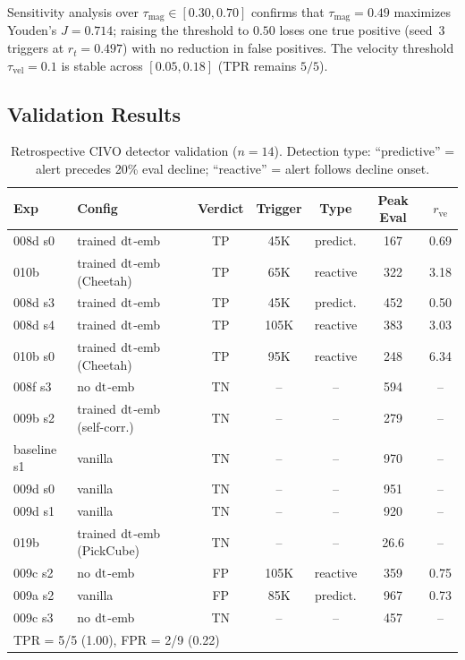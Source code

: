 Sensitivity analysis over $\tau_\text{mag} \in [0.30, 0.70]$ confirms that $\tau_\text{mag} = 0.49$ maximizes Youden's $J = 0.714$; raising the threshold to $0.50$ loses one true positive (seed~3 triggers at $r_t = 0.497$) with no reduction in false positives. The velocity threshold $\tau_\text{vel} = 0.1$ is stable across $[0.05, 0.18]$ (TPR remains $5/5$).

\subsection{Validation Results}

\begin{table}[ht]
\centering
\caption{Retrospective CIVO detector validation ($n{=}14$). Detection type: ``predictive'' = alert precedes 20\% eval decline; ``reactive'' = alert follows decline onset.}
\label{tab:detector-validation}
\footnotesize
\setlength{\tabcolsep}{3pt}
\begin{tabular}{llccccc}
\toprule
\textbf{Exp} & \textbf{Config} & \textbf{Verdict} & \textbf{Trigger} & \textbf{Type} & \textbf{Peak Eval} & $r_\text{ve}$ \\
\midrule
008d s0 & trained $\mathrm{dt}$-emb & TP & 45K & predict. & 167 & 0.69 \\
010b & trained $\mathrm{dt}$-emb (Cheetah) & TP & 65K & reactive & 322 & 3.18 \\
008d s3 & trained $\mathrm{dt}$-emb & TP & 45K & predict. & 452 & 0.50 \\
008d s4 & trained $\mathrm{dt}$-emb & TP & 105K & reactive & 383 & 3.03 \\
010b s0 & trained $\mathrm{dt}$-emb (Cheetah) & TP & 95K & reactive & 248 & 6.34 \\
\midrule
008f s3 & no $\mathrm{dt}$-emb & TN & -- & -- & 594 & -- \\
009b s2 & trained $\mathrm{dt}$-emb (self-corr.) & TN & -- & -- & 279 & -- \\
baseline s1 & vanilla & TN & -- & -- & 970 & -- \\
009d s0 & vanilla & TN & -- & -- & 951 & -- \\
009d s1 & vanilla & TN & -- & -- & 920 & -- \\
019b & trained $\mathrm{dt}$-emb (PickCube) & TN & -- & -- & 26.6 & -- \\
\midrule
009c s2 & no $\mathrm{dt}$-emb & FP & 105K & reactive & 359 & 0.75 \\
009a s2 & vanilla & FP & 85K & predict. & 967 & 0.73 \\
\midrule
009c s3 & no $\mathrm{dt}$-emb & TN & -- & -- & 457 & -- \\
\midrule
\multicolumn{7}{l}{TPR = 5/5 (1.00), \quad FPR = 2/9 (0.22)} \\
\bottomrule
\end{tabular}
\end{table}

